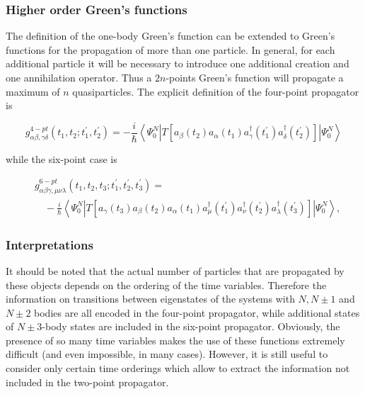 \documentclass[compress]{beamer}
\begin{document}
\frame
{
\frametitle{Higher order  Green's functions}
\begin{small}
{\scriptsize

The definition of the one-body Green's function  can be extended to Green's functions for the
propagation of more than one particle. In general, for each additional
particle it will be necessary to introduce one additional creation and
one annihilation operator. Thus a $2 n$-points Green's function will
propagate a maximum of $n$ quasiparticles. The explicit definition of
the four-point propagator is

$$
g_{\alpha \beta, \gamma \delta}^{4-p t}\left(t_{1}, t_{2} ; t_{1}^{\prime}, t_{2}^{\prime}\right)=-\frac{i}{\hbar}\left\langle\Psi_{0}^{N}\left|T\left[a_{\beta}\left(t_{2}\right) a_{\alpha}\left(t_{1}\right) a_{\gamma}^{\dagger}\left(t_{1}^{\prime}\right) a_{\delta}^{\dagger}\left(t_{2}^{\prime}\right)\right]\right| \Psi_{0}^{N}\right\rangle
$$

while the six-point case is

$$
\begin{aligned}
& g_{\alpha \beta \gamma, \mu \nu \lambda}^{6-p t}\left(t_{1}, t_{2}, t_{3} ; t_{1}^{\prime}, t_{2}^{\prime}, t_{3}^{\prime}\right)= \\
& \quad-\frac{i}{\hbar}\left\langle\Psi_{0}^{N}\left|T\left[a_{\gamma}\left(t_{3}\right) a_{\beta}\left(t_{2}\right) a_{\alpha}\left(t_{1}\right) a_{\mu}^{\dagger}\left(t_{1}^{\prime}\right) a_{\nu}^{\dagger}\left(t_{2}^{\prime}\right) a_{\lambda}^{\dagger}\left(t_{3}^{\prime}\right)\right]\right| \Psi_{0}^{N}\right\rangle,
\end{aligned}
$$

}
\end{small}
}
\frame
{
\frametitle{Interpretations}
\begin{small}
{\scriptsize
It should be noted that the actual number of particles that are
propagated by these objects depends on the ordering of the time
variables. Therefore the information on transitions between
eigenstates of the systems with $N, N \pm 1$ and $N \pm 2$ bodies are
all encoded in the four-point propagator, while additional states of $N \pm 3$-body
states are included in the six-point propagator. Obviously, the presence of so many
time variables makes the use of these functions extremely difficult
(and even impossible, in many cases). However, it is still useful to
consider only certain time orderings which allow to extract the
information not included in the two-point propagator.

}
\end{small}
}
\end{document}
